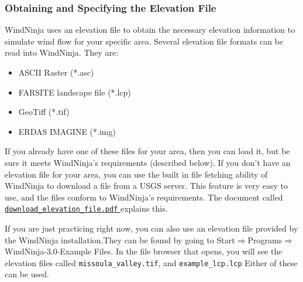 \documentclass[12pt]{article}
\begin{document}
\subsubsection{Obtaining and Specifying the Elevation File}

WindNinja uses an elevation file to obtain the necessary elevation information to simulate wind flow for your specific area.  Several elevation file formats can be read into WindNinja.  They are:

\begin{itemize}
\item[]ASCII Raster (*.asc)
\item[]FARSITE landscape file (*.lcp)
\item[]GeoTiff (*.tif)
\item[]ERDAS IMAGINE (*.img)
\end{itemize}

If you already have one of these files for your area, then you can load it, but be sure it meets WindNinja's requirements (described below).  If you don't have an elevation file for your area, you can use the built in file fetching ability of WindNinja to download a file from a USGS server.  This feature is very easy to use, and the files conform to WindNinja's requirements.  The document called \href{http://firelab.github.io/windinja/pdf/download_elevation_file.pdf}{\texttt{download\_elevation\_file.pdf} } explains this.

If you are just practicing right now, you can also use an elevation file provided by the WindNinja installation.They can be found by going to Start$\Rightarrow$Programs$\Rightarrow$WindNinja-3.0-Example Files.  
In the file browser that opens, you will see the elevation files called \texttt{missoula\_valley.tif}, and \texttt{example\_lcp.lcp} Either of these can be used.
\end{document}
